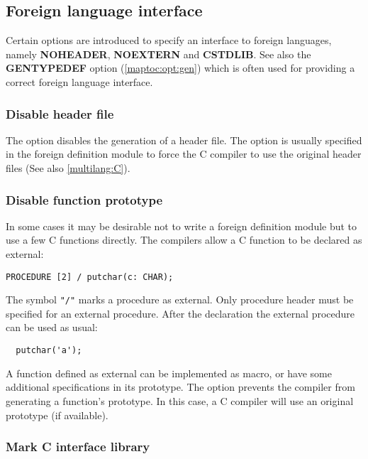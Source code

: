 \subsection{Foreign language interface}\label{maptoc:opt:foreign}

Certain options are introduced to specify an interface to foreign
languages,   namely  {\bf  NOHEADER},  {\bf  NOEXTERN}  and  {\bf
CSTDLIB}.     See    also    the    {\bf    GENTYPEDEF}    option
(\ref{maptoc:opt:gen})  which  is often used for providing a correct
foreign language interface.

\subsubsection{Disable header file}

The  option disables
the  generation of a header file. The option is usually specified
in  the  foreign definition module to force the C compiler to use
the original header files (See also \ref{multilang:C}).

\subsubsection{Disable function prototype}

In  some  cases  it  may  be  desirable  not  to  write a foreign
definition module but to use a few C functions directly.
The \xds{} compilers allow a C function to be declared as external:
\begin{verbatim}
PROCEDURE [2] / putchar(c: CHAR);
\end{verbatim}
The symbol \verb|"/"| marks a procedure as external. Only
procedure header must be specified for an external procedure.
After the declaration the external procedure can be used
as usual:
\begin{verbatim}
  putchar('a');
\end{verbatim}
A  function  defined  as external can be implemented as macro, or
have  some  additional  specifications in its prototype. The 
option  prevents the compiler from generating  a function's prototype.
In this case, a C compiler will use an original prototype (if available).

\subsubsection{Mark C interface library}

